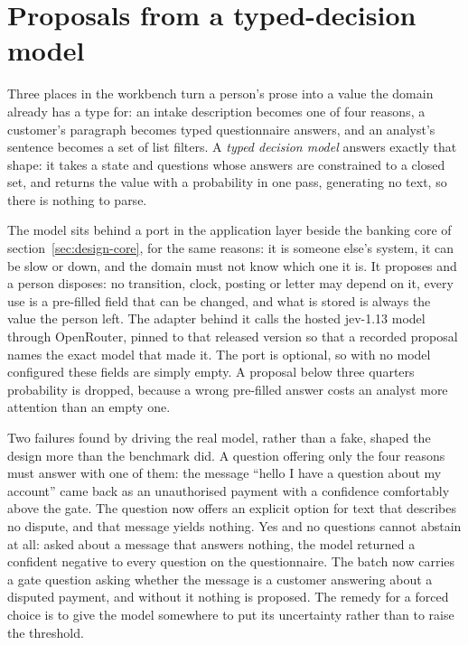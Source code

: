 \section{Proposals from a typed-decision model}
\label{sec:impl-decisions}

Three places in the workbench turn a person's prose into a value the domain already has a type for: an intake
description becomes one of four reasons, a customer's paragraph becomes typed questionnaire answers, and an
analyst's sentence becomes a set of list filters. A \emph{typed decision model} answers exactly that shape: it
takes a state and questions whose answers are constrained to a closed set, and returns the value with a
probability in one pass, generating no text, so there is nothing to parse.

The model sits behind a port in the application layer beside the banking core of section~\ref{sec:design-core},
for the same reasons: it is someone else's system, it can be slow or down, and the domain must not know which one
it is. It proposes and a person disposes: no transition, clock, posting or letter may depend on it, every use is a
pre-filled field that can be changed, and what is stored is always the value the person left. The adapter behind
it calls the hosted jev-1.13 model through OpenRouter, pinned to that released version so that a recorded
proposal names the exact model that made it. The port is
optional, so with no model configured these fields are simply empty. A proposal below three quarters
probability is dropped, because a wrong pre-filled answer costs an analyst more attention than an empty one.

Two failures found by driving the real model, rather than a fake, shaped the design more than the benchmark did.
A question offering only the four reasons must answer with one of them: the message ``hello I have a question
about my account'' came back as an unauthorised payment with a confidence comfortably above the gate. The
question now offers an explicit option for text that describes no dispute, and that message yields nothing. Yes
and no questions cannot abstain at all: asked about a message that answers nothing, the model returned a
confident negative to every question on the questionnaire. The batch now carries a gate question asking whether
the message is a customer answering about a disputed payment, and without it nothing is proposed. The remedy for a
forced choice is to give the model somewhere to put its uncertainty rather than to raise the threshold.

